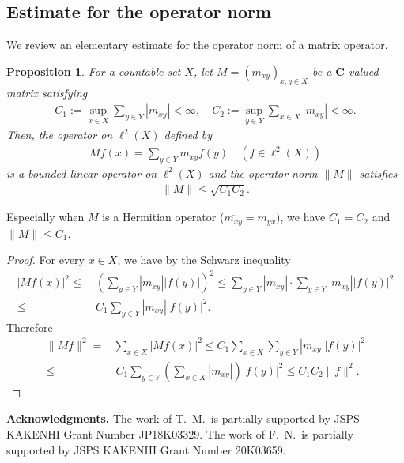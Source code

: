 \documentclass[12pt,a4paper]{article}
\newtheorem{proposition}[theorem]{Proposition}
\begin{document}
\subsection{Estimate for the operator norm}
We review an elementary estimate 
for the operator norm of a matrix operator.
\begin{proposition}
\label{prop_operator-norm}
For a countable set $X$,
let $M=(m_{xy})_{x,y\in X}$ be a 
$\mathbf{C}$-valued matrix satisfying
\begin{align*}
C_1:=\sup_{x\in X}\sum_{y\in Y}|m_{xy}|<\infty,\quad
C_2:=\sup_{y\in Y}\sum_{x\in X}|m_{xy}|<\infty.
\end{align*}
Then, the operator on $\ell^2(X)$
defined by
\begin{align*}
 M f(x)
=
\sum_{y\in Y} m_{xy} f(y)
\quad (f\in \ell^2(X))
\end{align*}
is a bounded linear operator on $\ell^2(X)$ 
and the operator norm $\|M\|$ satisfies
\begin{align*}
 \|M\|\leq \sqrt{C_1C_2}.
\end{align*}
\end{proposition}
Especially when $M$ is a Hermitian operator ($\overline{m_{xy}}=m_{yx}$),
we have $C_1=C_2$ and $\|M\|\leq C_1$.
\begin{proof}
For every $x\in X$, we have by the Schwarz inequality
\begin{align*}
 |Mf(x)|^2
\leq&\ 
\left(
\sum_{y\in Y}|m_{xy}| |f(y)|
\right)^2
\leq
\sum_{y\in Y}|m_{xy}|
\cdot
\sum_{y\in Y}|m_{xy}| |f(y)|^2
\\
\leq&\ 
C_1\sum_{y\in Y}|m_{xy}| |f(y)|^2.
\end{align*} 
Therefore
\begin{align*}
 \|Mf\|^2
=& 
\sum_{x\in X}|Mf(x)|^2
\leq
C_1\sum_{x\in X}\sum_{y\in Y}|m_{xy}||f(y)|^2\\
\leq&\ 
C_1\sum_{y\in Y}
\left(\sum_{x\in X}
|m_{xy}|\right)|f(y)|^2
\leq
C_1C_2\|f\|^2.
\end{align*}
\end{proof}





\textbf{Acknowledgments.}
The work of T.\ M.\ is partially supported by
JSPS KAKENHI Grant Number JP18K03329.
The work of F.\ N.\ is partially supported by
JSPS KAKENHI Grant Number 20K03659.
\end{document}
